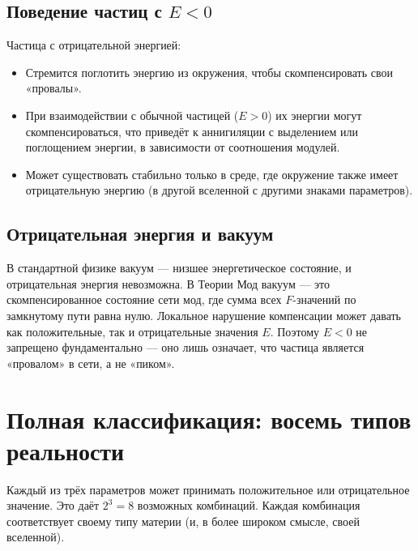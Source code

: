 \documentclass[12pt,a4paper]{article}
\begin{document}
\subsection{Поведение частиц с $E < 0$}
Частица с отрицательной энергией:
\begin{itemize}
    \item Стремится поглотить энергию из окружения, чтобы скомпенсировать свои «провалы».
    \item При взаимодействии с обычной частицей ($E > 0$) их энергии могут скомпенсироваться, что приведёт к аннигиляции с выделением или поглощением энергии, в зависимости от соотношения модулей.
    \item Может существовать стабильно только в среде, где окружение также имеет отрицательную энергию (в другой вселенной с другими знаками параметров).
\end{itemize}

\subsection{Отрицательная энергия и вакуум}
В стандартной физике вакуум --- низшее энергетическое состояние, и отрицательная энергия невозможна. В Теории Мод вакуум --- это скомпенсированное состояние сети мод, где сумма всех $F$-значений по замкнутому пути равна нулю. Локальное нарушение компенсации может давать как положительные, так и отрицательные значения $E$. Поэтому $E < 0$ не запрещено фундаментально --- оно лишь означает, что частица является «провалом» в сети, а не «пиком».

\section{Полная классификация: восемь типов реальности}
Каждый из трёх параметров может принимать положительное или отрицательное значение. Это даёт $2^3 = 8$ возможных комбинаций. Каждая комбинация соответствует своему типу материи (и, в более широком смысле, своей вселенной).
\end{document}
